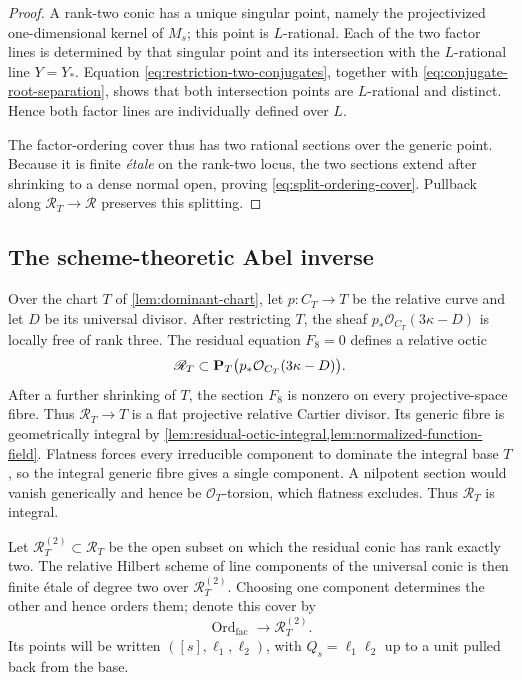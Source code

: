 \begin{proof}
A rank-two conic has a unique singular point, namely the projectivized
one-dimensional kernel of $M_s$; this point is $L$-rational.  Each of the
two factor lines is determined by that singular point and its intersection
with the $L$-rational line $Y=Y_*$.  Equation
\eqref{eq:restriction-two-conjugates}, together with
\eqref{eq:conjugate-root-separation}, shows that both intersection points
are $L$-rational and distinct.  Hence both factor lines are individually
defined over $L$.

The factor-ordering cover thus has two rational sections over the generic
point.  Because it is finite \emph{\'etale} on the rank-two locus, the two
sections extend after shrinking to a dense normal open, proving
\eqref{eq:split-ordering-cover}.  Pullback along $\mathscr R_T\to\mathscr R$
preserves this splitting.
\end{proof}

\subsection{The scheme-theoretic Abel inverse}

Over the chart $T$ of \cref{lem:dominant-chart}, let
$p:C_T\to T$ be the relative curve and let $D$ be its universal divisor.
After restricting $T$, the sheaf
$p_*\mathcal O_{C_T}(3\kappa-D)$ is locally free of rank three.  The
residual equation $F_8=0$ defines a relative octic
\[
 \mathscr R_T\subset
 \mathbf P_T\bigl(p_*\mathcal O_{C_T}(3\kappa-D)\bigr).
\]
After a further shrinking of $T$, the section $F_8$ is nonzero on every
projective-space fibre.  Thus $\mathscr R_T\to T$ is a flat projective
relative Cartier divisor.  Its generic fibre is geometrically integral by
\cref{lem:residual-octic-integral,lem:normalized-function-field}.  Flatness
forces every irreducible component to dominate the integral base $T$, so the
integral generic fibre gives a single component.  A nilpotent section would
vanish generically and hence be $\mathcal O_T$-torsion, which flatness
excludes.  Thus $\mathscr R_T$ is integral.

Let $\mathscr R_T^{(2)}\subset\mathscr R_T$ be the open subset on which the
residual conic has rank exactly two.  The relative Hilbert scheme of line
components of the universal conic is then finite \'etale of degree two over
$\mathscr R_T^{(2)}$.  Choosing one component determines the other and hence
orders them; denote this cover by
\[
 \operatorname{Ord}_{\mathrm{fac}}
    \longrightarrow\mathscr R_T^{(2)}.
\]
Its points will be written $([s],\ell_1,\ell_2)$, with
$Q_s=\ell_1\ell_2$ up to a unit pulled back from the base.

